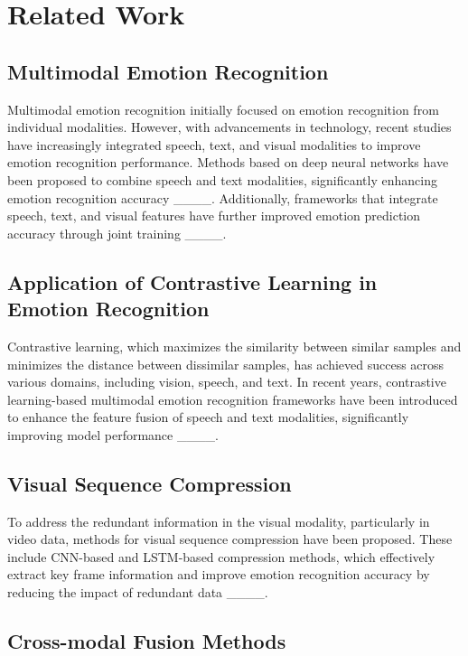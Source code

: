 \section{Related Work}
\subsection{Multimodal Emotion Recognition}

Multimodal emotion recognition initially focused on emotion recognition from individual modalities. However, with advancements in technology, recent studies have increasingly integrated speech, text, and visual modalities to improve emotion recognition performance. Methods based on deep neural networks have been proposed to combine speech and text modalities, significantly enhancing emotion recognition accuracy ____. Additionally, frameworks that integrate speech, text, and visual features have further improved emotion prediction accuracy through joint training ____.

\subsection{Application of Contrastive Learning in Emotion Recognition}

Contrastive learning, which maximizes the similarity between similar samples and minimizes the distance between dissimilar samples, has achieved success across various domains, including vision, speech, and text. In recent years, contrastive learning-based multimodal emotion recognition frameworks have been introduced to enhance the feature fusion of speech and text modalities, significantly improving model performance ____.

\subsection{Visual Sequence Compression}

To address the redundant information in the visual modality, particularly in video data, methods for visual sequence compression have been proposed. These include CNN-based and LSTM-based compression methods, which effectively extract key frame information and improve emotion recognition accuracy by reducing the impact of redundant data ____.

\subsection{Cross-modal Fusion Methods}

